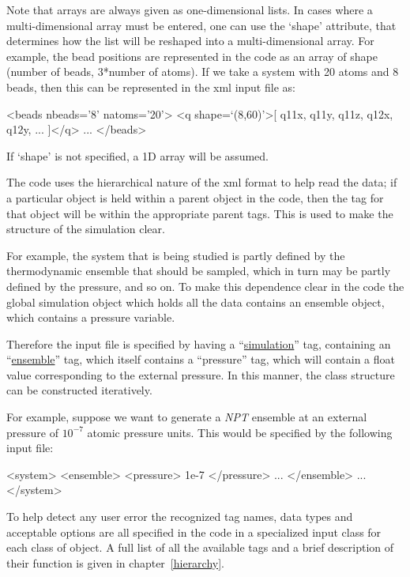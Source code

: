 \documentclass[11pt,english,fleqn]{report}
\newenvironment{code}{%
\footnotesize
\verbatim
}{
\endverbatim
\normalsize
}
\begin{document}
Note that arrays are always given as one-dimensional lists. In cases
where a multi-dimensional array must be entered, one can use the `shape'
attribute, that determines how the list will be reshaped into a multi-dimensional
array. For example, the bead positions are
represented in the code as an array of shape
(number of beads, 3*number of atoms). If we take a system with 20 atoms
and 8 beads, then this can be represented in the xml input file as:

\begin{code}
<beads nbeads='8' natoms='20'>
   <q shape=`(8,60)'>[ q11x, q11y, q11z, q12x, q12y, ... ]</q>
   ...
</beads>
\end{code}

If `shape' is not specified, a 1D array will be assumed.

The code uses the hierarchical nature of the xml format to help read the data; if
a particular object is held within a parent object in the code, then
the tag for that object will be within the appropriate parent tags.
This is used to make the structure of the simulation clear.

For example,
the system that is being studied is partly defined by the thermodynamic
ensemble that should be sampled, which in turn may be partly defined
by the pressure, and so on. To make this dependence clear in the code
the global simulation object which holds all the data contains
an ensemble object, which contains a pressure variable.

Therefore the input file is specified
by having a {}``\hyperref[SIMULATION]{simulation}'' tag, containing an
{}``\hyperref[ENSEMBLE]{ensemble}''
tag, which itself contains a {}``pressure'' tag, which will contain
a float value corresponding to the external pressure. In this
manner, the class structure can be constructed iteratively.

For example, suppose we want to generate a \emph{NPT} ensemble at an external
pressure of \(10^{-7}\) atomic pressure units. This would be specified by
the following input file:

\begin{code}
<system>
   <ensemble>
      <pressure> 1e-7 </pressure>
      ...
   </ensemble>
   ...
</system>
\end{code}

To help detect any user error the recognized tag names, data types
and acceptable options are all specified in the code in a specialized
input class for each class of object. A full list of all the available
tags and a brief description of their function is given in chapter~\ref{hierarchy}.
\end{document}
